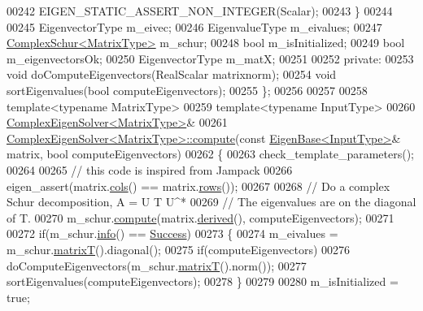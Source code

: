 \begin{DoxyCode}
00242       EIGEN\_STATIC\_ASSERT\_NON\_INTEGER(Scalar);
00243     \}
00244     
00245     EigenvectorType m\_eivec;
00246     EigenvalueType m\_eivalues;
00247     \hyperlink{group___eigenvalues___module}{ComplexSchur<MatrixType>} m\_schur;
00248     \textcolor{keywordtype}{bool} m\_isInitialized;
00249     \textcolor{keywordtype}{bool} m\_eigenvectorsOk;
00250     EigenvectorType m\_matX;
00251 
00252   \textcolor{keyword}{private}:
00253     \textcolor{keywordtype}{void} doComputeEigenvectors(RealScalar matrixnorm);
00254     \textcolor{keywordtype}{void} sortEigenvalues(\textcolor{keywordtype}{bool} computeEigenvectors);
00255 \};
00256 
00257 
00258 \textcolor{keyword}{template}<\textcolor{keyword}{typename} MatrixType>
00259 \textcolor{keyword}{template}<\textcolor{keyword}{typename} InputType>
00260 \hyperlink{group___eigenvalues___module_class_eigen_1_1_complex_eigen_solver}{ComplexEigenSolver<MatrixType>}& 
00261 \hyperlink{group___eigenvalues___module_aeb7e38c6db5369f5c974f3786e94c1f0}{ComplexEigenSolver<MatrixType>::compute}(\textcolor{keyword}{const} 
      \hyperlink{group___core___module_struct_eigen_1_1_eigen_base}{EigenBase<InputType>}& matrix, \textcolor{keywordtype}{bool} computeEigenvectors)
00262 \{
00263   check\_template\_parameters();
00264   
00265   \textcolor{comment}{// this code is inspired from Jampack}
00266   eigen\_assert(matrix.\hyperlink{group___core___module_a7b0b45c7351847696c911ce8aa2abbdb}{cols}() == matrix.\hyperlink{group___core___module_a8141320ba8df384426c298b32b000d8e}{rows}());
00267 
00268   \textcolor{comment}{// Do a complex Schur decomposition, A = U T U^*}
00269   \textcolor{comment}{// The eigenvalues are on the diagonal of T.}
00270   m\_schur.\hyperlink{group___eigenvalues___module_a3543d2c286563108cd9ace672bbb1c09}{compute}(matrix.\hyperlink{group___core___module_a324b16961a11d2ecfd2d1b7dd7946545}{derived}(), computeEigenvectors);
00271 
00272   \textcolor{keywordflow}{if}(m\_schur.\hyperlink{group___eigenvalues___module_a8c5ee15fecfd126fc362c3f2fd28f51e}{info}() == \hyperlink{group__enums_gga85fad7b87587764e5cf6b513a9e0ee5ea52581b035f4b59c203b8ff999ef5fcea}{Success})
00273   \{
00274     m\_eivalues = m\_schur.\hyperlink{group___eigenvalues___module_add3ab5ed83f7f2f06b79fa910a2d5684}{matrixT}().diagonal();
00275     \textcolor{keywordflow}{if}(computeEigenvectors)
00276       doComputeEigenvectors(m\_schur.\hyperlink{group___eigenvalues___module_add3ab5ed83f7f2f06b79fa910a2d5684}{matrixT}().norm());
00277     sortEigenvalues(computeEigenvectors);
00278   \}
00279 
00280   m\_isInitialized = \textcolor{keyword}{true};

\end{DoxyCode}

